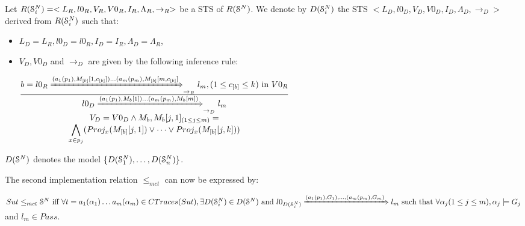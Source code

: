 
\begin{definition}
    Let
    $R(\EuScript{S}_i^{N})=<L_R,l0_R,V_R,V0_R,I_R,\Lambda_R,\rightarrow_R>$
    be a STS of $R(\EuScript{S}^{N})$. We denote by $D(\EuScript{S}_i^{N})$ the STS $ <L_D,l0_D,V_D,V0_D,I_D,\Lambda_D,\rightarrow_D>$ derived from $R(\EuScript{S}_i^{N})$ such that:
\begin{itemize}
    \item $L_D=L_{R}, l0_D=l0_{R}, I_D=I_{R}, \Lambda_D=\Lambda_{R}$,
    \item $V_D, V0_D$ and $\rightarrow_D$ are given by the following inference rule:

				$\frac{
					\begin{matrix}
					b=l0_{R}
					\xRightarrow{(a_1(p_1),M_{[b]}[1,c_{[b]}])\dots (a_m(p_m),M_{[b]}[m,c_{[b]}]}_{\rightarrow_{R}}
					l_{m},
					(1 \leq c_{[b]} \leq k) \text{ in } V0_{R}
					\end{matrix}
				}
				{
					\begin{matrix}
					l0_D
					\xRightarrow{(a_1(p_1),M_b[1])\dots (a_m(p_m),M_b[m])}_{\rightarrow_D}
					l_m\\
					V_D=V0_D \wedge M_b, M_b[j, 1]_{(1\leq j \leq m)} =\\
					 \displaystyle \bigwedge_{x \in p_j} ( Proj_x(M_{[b]}[j, 1]) \vee \dots \vee Proj_x(M_{[b]}[j, k]))



					\end{matrix}
				}$
  \end{itemize}

    $D(\EuScript{S}^{N})$ denotes the model $\{D(\EuScript{S}_1^{N}),\dots,D(\EuScript{S}_n^{N}) \}$.
\end{definition}


The second implementation relation $\leq_{mct}$ can now be
expressed by:

\begin{proposition}
    ${Sut} \leq_{mct} \EuScript{S}^{N} \text{ iff }\forall t=
    a_1(\alpha_1) \dots a_m(\alpha_m) \in CTraces({Sut}), \exists
    D(\EuScript{S}_i^{N}) \in D(\EuScript{S}^{N}) \text{ and }
    l0_{D(\EuScript{S}_i^{N})}
    \xRightarrow{(a_1(p_1),G_{1}),\dots,(a_m(p_m),G_{m})} l_m
    \text{ such that } \forall \alpha_j (1 \leq j \leq m),
    \alpha_j \models G_{j}$ and $l_m \in Pass$.
\end{proposition}


